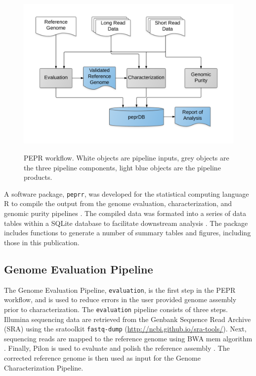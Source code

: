 \documentclass[smallextended]{svjour3}\usepackage[]{graphicx}\usepackage[]{color}
\begin{document}
\begin{figure}
\includegraphics[width=\textwidth]{pepr-workflow.png}
\label{fig:workflowFig}
\caption{PEPR workflow. White objects are pipeline inputs, grey objects are the three pipeline components, light blue objects are the pipeline products.}
\end{figure}

A software package, \texttt{peprr}, was developed for the statistical computing language R to compile the output from the genome evaluation, characterization, and genomic purity pipelines \cite{R2015}. The compiled data was formated into a series of data tables within a SQLite database to facilitate downstream analysis \cite{wickham2014tidy}.  The package includes functions to generate a number of summary tables and figures, including those in this publication.

\subsection{Genome Evaluation Pipeline}
\label{method:2}
The Genome Evaluation Pipeline, \texttt{evaluation}, is the first step in the PEPR workflow, and is used to reduce errors in the user provided genome assembly prior to characterization. The \texttt{evaluation} pipeline consists of three steps.  Illumina sequencing data are retrieved from the Genbank Sequence Read Archive (SRA) using the sratoolkit \texttt{fastq-dump} (\url{http://ncbi.github.io/sra-tools/}). Next, sequencing reads are mapped to the reference genome using BWA mem algorithm \cite{Li2013c}. Finally, Pilon is used to evaluate and polish the reference assembly \cite{Walker2014}. The corrected reference genome is then used as input for the Genome Characterization Pipeline.
\end{document}

